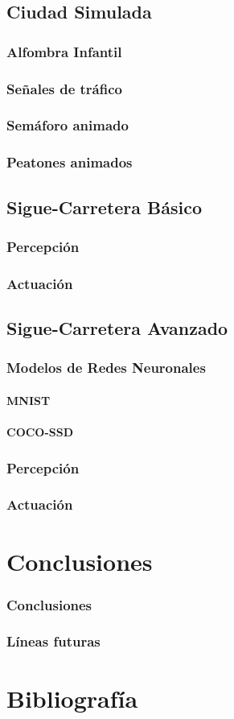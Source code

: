 \documentclass{report}
\begin{document}
\section{Ciudad Simulada}
\subsection{Alfombra Infantil}
\subsection{Señales de tráfico}
\subsection{Semáforo animado}
\subsection{Peatones animados}
\section{Sigue-Carretera Básico}
\subsection{Percepción}
\subsection{Actuación}
\section{Sigue-Carretera Avanzado}
\subsection{Modelos de Redes Neuronales}
\subsubsection{MNIST}
\subsubsection{COCO-SSD}
\subsection{Percepción}
\subsection{Actuación}

\chapter{Conclusiones}
\subsection{Conclusiones}
\subsection{Líneas futuras}

\chapter{Bibliografía}
\end{document}
